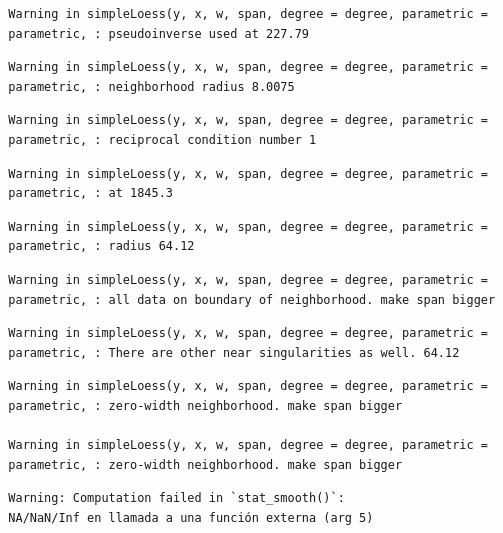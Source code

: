 \documentclass[12pt,twoside]{reedthesis}
\begin{document}
  \begin{verbatim}
  Warning in simpleLoess(y, x, w, span, degree = degree, parametric =
  parametric, : pseudoinverse used at 227.79
  \end{verbatim}
  
  \begin{verbatim}
  Warning in simpleLoess(y, x, w, span, degree = degree, parametric =
  parametric, : neighborhood radius 8.0075
  \end{verbatim}
  
  \begin{verbatim}
  Warning in simpleLoess(y, x, w, span, degree = degree, parametric =
  parametric, : reciprocal condition number 1
  \end{verbatim}
  
  \begin{verbatim}
  Warning in simpleLoess(y, x, w, span, degree = degree, parametric =
  parametric, : at 1845.3
  \end{verbatim}
  
  \begin{verbatim}
  Warning in simpleLoess(y, x, w, span, degree = degree, parametric =
  parametric, : radius 64.12
  \end{verbatim}
  
  \begin{verbatim}
  Warning in simpleLoess(y, x, w, span, degree = degree, parametric =
  parametric, : all data on boundary of neighborhood. make span bigger
  \end{verbatim}
  
  \begin{verbatim}
  Warning in simpleLoess(y, x, w, span, degree = degree, parametric =
  parametric, : There are other near singularities as well. 64.12
  \end{verbatim}
  
  \begin{verbatim}
  Warning in simpleLoess(y, x, w, span, degree = degree, parametric =
  parametric, : zero-width neighborhood. make span bigger
  
  Warning in simpleLoess(y, x, w, span, degree = degree, parametric =
  parametric, : zero-width neighborhood. make span bigger
  \end{verbatim}
  
  \begin{verbatim}
  Warning: Computation failed in `stat_smooth()`:
  NA/NaN/Inf en llamada a una función externa (arg 5)
  \end{verbatim}
  
\end{document}
